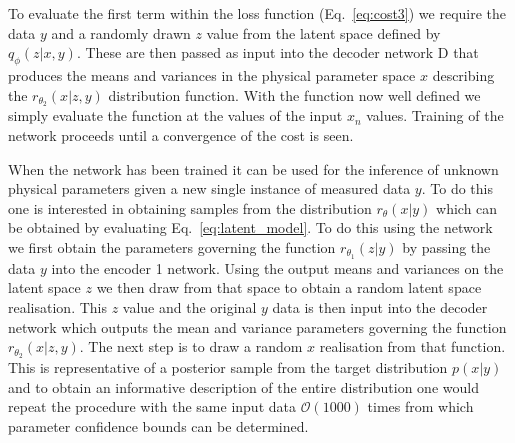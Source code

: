\documentclass[%
showpacs,
 amsmath,amssymb,
 aps,
 twocolumn,
 prl,
 reprint,
floatfix,
]{revtex4-1}
\begin{document}
To evaluate the first term within the loss function (Eq.~\ref{eq:cost3}) we
require the data $y$ and a randomly drawn $z$ value from the latent space defined
by $q_{\phi}(z|x,y)$. These are then passed as input into the decoder network D
that produces the means and variances in the physical parameter space $x$ describing
the $r_{\theta_{2}}(x|z,y)$ distribution function. With the function now well
defined we simply evaluate the function at the values of the input $x_{n}$
values. Training of the network proceeds until a convergence of the cost is
seen. 

When the network has been trained it can be used for the inference of unknown
physical parameters given a new single instance of measured data $y$. To do
this one is interested in obtaining samples from the distribution
$r_{\theta}(x|y)$ which can be obtained by evaluating
Eq.~\ref{eq:latent_model}. To do this using the network we first obtain the
parameters governing the function $r_{\theta_{1}}(z|y)$ by passing the data $y$
into the encoder 1 network. Using the output means and variances on the latent space
$z$ we then draw from that space to obtain a random latent space realisation.
This $z$ value and the original $y$ data is then input into the decoder network
which outputs the mean and variance parameters governing the function
$r_{\theta_{2}}(x|z,y)$. The next step is to draw a random $x$ realisation from
that function. This is representative of a posterior sample from the target
distribution $p(x|y)$ and to obtain an informative description of the entire
distribution one would repeat the procedure with the same input data
$\mathcal{O}(1000)$ times from which parameter confidence bounds can be
determined.      



\end{document}
